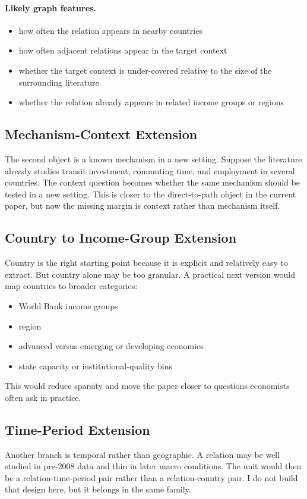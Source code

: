 \documentclass[11pt]{article}
\begin{document}
\paragraph{Likely graph features.}
\begin{itemize}
    \item how often the relation appears in nearby countries
    \item how often adjacent relations appear in the target context
    \item whether the target context is under-covered relative to the size of the surrounding literature
    \item whether the relation already appears in related income groups or regions
\end{itemize}

\subsection{Mechanism-Context Extension}
The second object is a known mechanism in a new setting. Suppose the literature already studies transit investment, commuting time, and employment in several countries. The context question becomes whether the same mechanism should be tested in a new setting. This is closer to the direct-to-path object in the current paper, but now the missing margin is context rather than mechanism itself.

\subsection{Country to Income-Group Extension}
Country is the right starting point because it is explicit and relatively easy to extract. But country alone may be too granular. A practical next version would map countries to broader categories:
\begin{itemize}
    \item World Bank income groups
    \item region
    \item advanced versus emerging or developing economies
    \item state capacity or institutional-quality bins
\end{itemize}
This would reduce sparsity and move the paper closer to questions economists often ask in practice.

\subsection{Time-Period Extension}
Another branch is temporal rather than geographic. A relation may be well studied in pre-2008 data and thin in later macro conditions. The unit would then be a relation-time-period pair rather than a relation-country pair. I do not build that design here, but it belongs in the same family.
\end{document}
